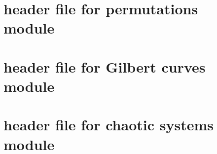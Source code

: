\documentclass[12pt, a4paper, twoside]{article}
\begin{document}
\setcounter{figure}{0}
\renewcommand{\thefigure}{A\arabic{figure}}

\setcounter{table}{0}
\renewcommand{\thetable}{A\arabic{table}}

\section{header file for permutations module}



\clearpage

\section{header file for Gilbert curves module}



\clearpage

\section{header file for chaotic systems module}


\end{document}
